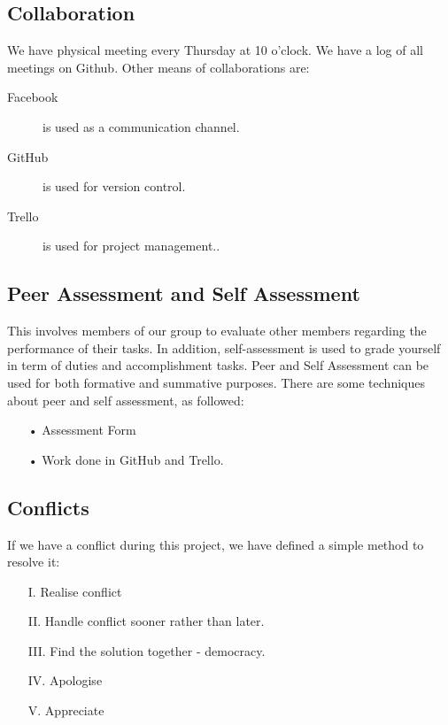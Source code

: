\documentclass[11pt]{article}
\begin{document}
\subsection{Collaboration}
We have physical meeting every Thursday at 10 o'clock. We have a log of all meetings on Github. Other means of collaborations are:
\begin{description}
\item[Facebook] is used as a communication channel.
\item[GitHub] is used for version control.
\item[Trello] is used for project management..
\end{description}

\subsection{Peer Assessment and Self Assessment}
This involves members of our group to evaluate other members regarding the performance of
their tasks. In addition, self-assessment is used to grade yourself in term of duties and
accomplishment tasks. Peer and Self Assessment can be used for both formative and summative
purposes. There are some techniques about peer and self assessment, as followed:
\begin{itemize}
\item[•] Assessment Form
\item[•] Work done in GitHub and Trello.  
\end{itemize}

\subsection{Conflicts}
If we have a conflict during this project, we have defined a simple method to resolve it: 
\begin{itemize}
\item[I. ]Realise conflict
\item[II. ] Handle conflict sooner rather than later.
\item[III. ] Find the solution together - democracy.
\item[IV. ] Apologise
\item[V. ] Appreciate
\end{itemize}
\end{document}
